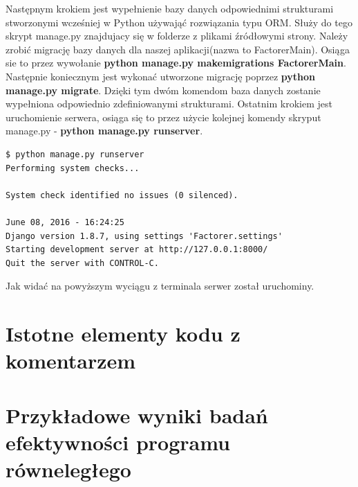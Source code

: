 \documentclass{article}
\begin{document}
Następnym krokiem jest wypełnienie bazy danych odpowiednimi strukturami stworzonymi wcześniej w Python używająć rozwiązania typu ORM. Służy do tego skrypt manage.py znajdujacy się w folderze z plikami źródłowymi strony. Należy zrobić migrację bazy danych dla naszej aplikacji(nazwa to FactorerMain). Osiąga sie to przez wywołanie \textbf{python manage.py makemigrations FactorerMain}. Następnie koniecznym jest wykonać utworzone migrację poprzez \textbf{python manage.py migrate}. Dzięki tym dwóm komendom baza danych zostanie wypełniona odpowiednio zdefiniowanymi strukturami. Ostatnim krokiem jest uruchomienie serwera, osiąga się to przez użycie kolejnej komendy skryput manage.py - \textbf{python manage.py runserver}.
\begin{lstlisting}
$ python manage.py runserver
Performing system checks...

System check identified no issues (0 silenced).

June 08, 2016 - 16:24:25
Django version 1.8.7, using settings 'Factorer.settings'
Starting development server at http://127.0.0.1:8000/
Quit the server with CONTROL-C.

\end{lstlisting}

Jak widać na powyższym wyciągu z terminala serwer został uruchominy.

\section{Istotne elementy kodu z komentarzem}

\newpage
\section{Przykładowe wyniki badań efektywności programu równeległego}
\end{document}
